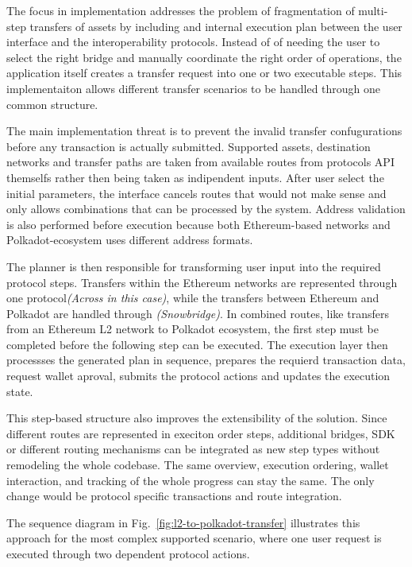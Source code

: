 \documentclass[conference]{IEEEtran}
\begin{document}
The focus in implementation addresses the problem of fragmentation of multi-step transfers of assets by including and internal execution plan between the user interface and the interoperability protocols. Instead of of needing the user to select the right bridge and manually coordinate the right order of operations, the application itself creates a transfer request into one or two executable steps. This implementaiton allows different transfer scenarios to be handled through one common structure.

The main implementation threat is to prevent the invalid transfer confugurations before any transaction is actually submitted. Supported assets, destination networks and transfer paths are taken from available routes from protocols API themselfs rather then being taken as indipendent inputs. After user select the initial parameters, the interface cancels routes that would not make sense and only allows combinations that can be processed by the system. Address validation is also performed before execution because both Ethereum-based networks and Polkadot-ecosystem uses different address formats.


The planner is then responsible for transforming user input into the required protocol steps. Transfers within the Ethereum networks are represented through one protocol\textit{(Across in this case)}, while the transfers between Ethereum and Polkadot are handled through \textit{(Snowbridge)}. In combined routes, like transfers from an Ethereum L2 network to Polkadot ecosystem, the first step must be completed before the following step can be executed. The execution layer then processses the generated plan in sequence, prepares the requierd transaction data, request wallet aproval, submits the protocol actions and updates the execution state.

This step-based structure also improves the extensibility of the solution. Since different routes are represented in execiton order steps, additional bridges, SDK or different routing mechanisms can be integrated as new step types without remodeling the whole codebase. The same overview, execution ordering, wallet interaction, and tracking of the whole progress can stay the same. The only change would be protocol specific transactions and route integration.

The sequence diagram in Fig.~\ref{fig:l2-to-polkadot-transfer} illustrates this approach for the most complex supported scenario, where one user request is executed through two dependent protocol actions.
\end{document}
